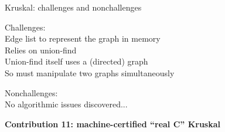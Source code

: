 \documentclass[usenames, xcolor=dvipsnames]{beamer}
\newcommand{\hide}[1]{}
\newcommand{\m}[1]{\ensuremath{\mathit{#1}}} %
\begin{document}
\begin{frame}{Kruskal: challenges and nonchallenges}

Challenges: \\ \pause
\hspace{1em} Edge list to represent the graph in memory \\ \pause
\hspace{1em} Relies on union-find \\ \pause
\hspace{1em} Union-find itself uses a (directed) graph \\ \pause
\hspace{1em} So must manipulate two graphs simultaneously \\ \pause

\bigskip

Nonchallenges: \\ \pause
\hspace{1em} No algorithmic issues discovered... \\ \pause

\bigskip

{\textbf{Contribution 11: machine-certified ``real C'' Kruskal}}

\hide{
Extend spatial support: \\
\hspace{1em} lay out edgelist-represented graphs in memory \\
\hspace{1em} develop fold-unfold utilities in separation logic

\bigskip

The undirected development carries over wholesale

\bigskip

Manipulate two graphs simultaneously: \\
\hspace{1em}directed graph with vertex labels (stores parents and ranks) \\
\hspace{1em}undirected graph with edge labels (for which we construct an MSF)
}
\end{frame}

\hide{
\begin{frame}{Kruksal: layering undirectedness atop of union-find}
  We have just performed $\texttt{union}^{d}$ \m{a} \m{b} \\
  \vspace{2em}
  {\centering
  

  }
 \pause \bigskip
  What can we say about $\texttt{connected}^{u}$ \m{a} \m{b}? \uncover<3>{$\texttt{connected}^{u}$ \m{c} \m{b}?}
\end{frame}
}
\end{document}
